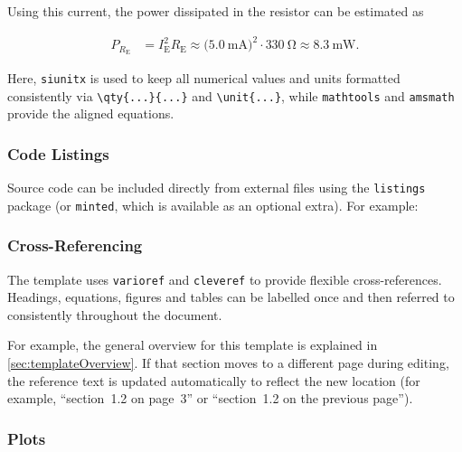 Using this current, the power dissipated in the resistor can be estimated as

\begin{align}
  P_{R_{\text{E}}}
    &= I_{\text{E}}^{2} R_{\text{E}}
     \approx \bigl(\qty{5.0}{\milli\ampere}\bigr)^{2}
              \cdot \qty{330}{\ohm}
     \approx \qty{8.3}{\milli\watt}.
\end{align}

Here, \texttt{siunitx} is used to keep all numerical values and units formatted
consistently via \verb|\qty{...}{...}| and \verb|\unit{...}|, while \texttt{mathtools}
and \texttt{amsmath} provide the aligned equations.

\subsubsection{Code Listings}

Source code can be included directly from external files using the \texttt{listings} package (or \texttt{minted}, which is available as an optional extra). For example:



\subsubsection{Cross-Referencing}

The template uses \texttt{varioref} and \texttt{cleveref} to provide flexible
cross-references. Headings, equations, figures and tables can be labelled once
and then referred to consistently throughout the document.

For example, the general overview for this template is explained in
{\vref{sec:templateOverview}}. If that section moves to a different
page during editing, the reference text is updated automatically to reflect the
new location (for example, “section~1.2 on page~3” or “section~1.2 on the
previous page”).

\subsubsection{Plots}

